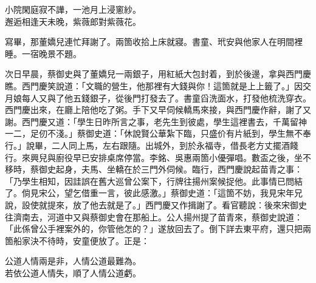 \begin{myquote} 
小院閑庭寂不譁，一池月上浸窻紗。\\邂逅相逢天未晚，紫薇郎對紫薇花。
\end{myquote} 

寫畢，那董嬌兒連忙拜謝了。兩箇收拾上床就寢。書童、玳安與他家人在明間裡睡。一宿晚景不題。

次日早晨，蔡御史與了董嬌兒一兩銀子，用紅紙大包封着，到於後邊，拿與西門慶瞧。西門慶笑說道：「文職的營生，他那裡有大錢與你！這箇就是上上籤了。」因交月娘每人又與了他五錢銀子，從後門打發去了。書童舀洗面水，打發他梳洗穿衣。西門慶出來，在廳上陪他吃了粥。手下又早伺候轎馬來接，與西門慶作辭，謝了又謝。西門慶又道：「學生日昨所言之事，老先生到彼處，學生這裡書去，千萬留神一二，足仞不淺。」蔡御史道：「休說賢公華紮下臨，只盛价有片紙到，學生無不奉行。」說畢，二人同上馬，左右跟隨。出城外，到於永福寺，借長老方丈擺酒餞行。來興兒與廚役早已安排桌席停當。李銘、吳惠兩箇小優彈唱。數盃之後，坐不移時，蔡御史起身，夫馬、坐轎在於三門外伺候。臨行，西門慶說起苗青之事：「乃學生相知，因詿誤在舊大巡曾公案下，行牌往揚州案候捉他。此事情已問結了。倘見宋公，望乞借重一言，彼此感激。」蔡御史道：「這箇不妨，我見宋年兄說，設使就提來，放了他去就是了。」西門慶又作揖謝了。看官聽說：後來宋御史往濟南去，河道中又與蔡御史會在那船上。公人揚州提了苗青來，蔡御史說道：「此係曾公手裡案外的，你管他怎的？」遂放回去了。倒下詳去東平府，還只把兩箇船家決不待時，安童便放了。正是：

\begin{myquote} 
公道人情兩是非，人情公道最難為。\\若依公道人情失，順了人情公道虧。
\end{myquote} 

